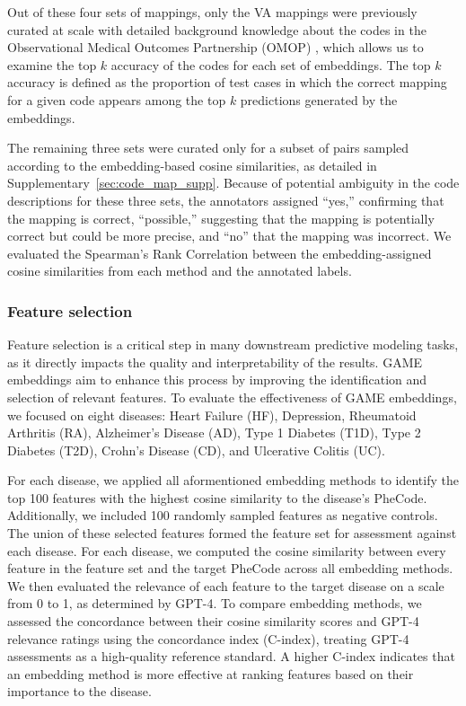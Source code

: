 \documentclass{article}
\begin{document}
Out of these four sets of mappings, only the VA mappings were previously curated at scale with detailed background knowledge about the codes in the Observational Medical Outcomes Partnership (OMOP) \cite{OMOP}, which allows us to examine the top $k$ accuracy of the codes for each set of embeddings. The top $k$ accuracy is defined as the proportion of test cases in which the correct mapping for a given code appears among the top 
$k$ predictions generated by the embeddings. 

The remaining three sets were curated only for a subset of pairs sampled according to the embedding-based cosine similarities, as detailed in Supplementary~\ref{sec:code_map_supp}. Because of  potential ambiguity in the code descriptions for these three sets, the annotators assigned ``yes,'' confirming that the mapping is correct, ``possible,'' suggesting that the mapping is potentially correct but could be more precise, and ``no'' that the mapping was incorrect. We evaluated the Spearman's Rank Correlation between the embedding-assigned cosine similarities from each method and the annotated labels.


\subsubsection{Feature selection}
Feature selection is a critical step in many downstream predictive modeling tasks, as it directly impacts the quality and interpretability of the results. GAME embeddings aim to enhance this process by improving the identification and selection of relevant features. To evaluate the effectiveness of GAME embeddings, we focused on eight diseases: Heart Failure (HF), Depression, Rheumatoid Arthritis (RA), Alzheimer's Disease (AD), Type 1 Diabetes (T1D), Type 2 Diabetes (T2D), Crohn's Disease (CD), and Ulcerative Colitis (UC).

For each disease, we applied all aformentioned embedding methods to identify the top 100 features with the highest cosine similarity to the disease’s PheCode. Additionally, we included 100 randomly sampled features as negative controls. The union of these selected features formed the feature set for assessment against each disease. For each disease, we computed the cosine similarity between every feature in the feature set and the target PheCode across all embedding methods. We then evaluated the relevance of each feature to the target disease on a scale from 0 to 1, as determined by GPT-4. To compare embedding methods, we assessed the concordance between their cosine similarity scores and GPT-4 relevance ratings using the concordance index (C-index), treating GPT-4 assessments as a high-quality reference standard. A higher C-index indicates that an embedding method is more effective at ranking features based on their importance to the disease.
\end{document}
